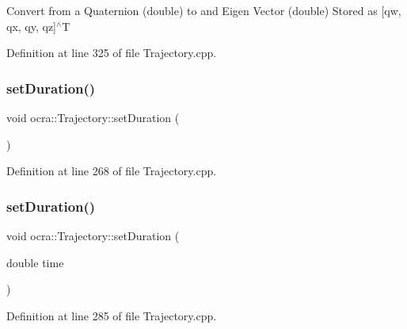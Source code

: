 Convert from a Quaternion (double) to and Eigen Vector (double) Stored as \mbox{[}qw, qx, qy, qz\mbox{]}$^\wedge$T

Definition at line 325 of file Trajectory.\+cpp.

\hypertarget{classocra_1_1Trajectory_a4e0a8295e1b8eb74cd13f130e5ab1475}{}\label{classocra_1_1Trajectory_a4e0a8295e1b8eb74cd13f130e5ab1475} 
\subsubsection{\texorpdfstring{set\+Duration()}{setDuration()}\hspace{0.1cm}{\footnotesize\ttfamily [1/2]}}
{\footnotesize\ttfamily void ocra\+::\+Trajectory\+::set\+Duration (\begin{DoxyParamCaption}{ }\end{DoxyParamCaption})}



Definition at line 268 of file Trajectory.\+cpp.

\hypertarget{classocra_1_1Trajectory_abc96649d0b4431608ceb524f9db3b73b}{}\label{classocra_1_1Trajectory_abc96649d0b4431608ceb524f9db3b73b} 
\subsubsection{\texorpdfstring{set\+Duration()}{setDuration()}\hspace{0.1cm}{\footnotesize\ttfamily [2/2]}}
{\footnotesize\ttfamily void ocra\+::\+Trajectory\+::set\+Duration (\begin{DoxyParamCaption}\item[{double}]{time }\end{DoxyParamCaption})}



Definition at line 285 of file Trajectory.\+cpp.

\hypertarget{classocra_1_1Trajectory_a617400d2591ef575f20ca2b431151ace}{}\label{classocra_1_1Trajectory_a617400d2591ef575f20ca2b431151ace} 
